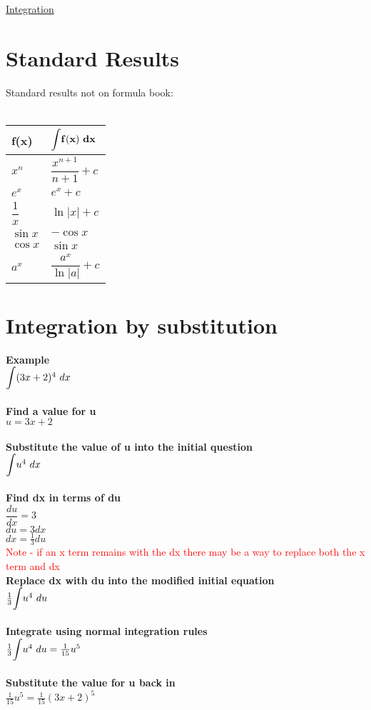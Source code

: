 \documentclass{article}[18pt]
\begin{document}
\begin{center}
\underline{\huge Integration}
\end{center}
\section{Standard Results}
Standard results not on formula book:\\
\\
{\renewcommand{\arraystretch}{2}
\begin{tabu} to \textwidth { | X[c] | X[c] | }
 \hline
 \textbf{f(x)} & $\mathbf{\mathlarger{\int} f(x)\ dx}$ \\
 \hline
 $x^n$  & $\dfrac{x^{n+1}}{n+1}+c$ \\
\hline
$e^x$&$e^x+c$\\
\hline
$\dfrac{1}{x}$&$\ln|x|+c$\\
\hline
$\sin x$&$-\cos x$\\
\hline
$\cos x$&$\sin x$\\
\hline
$a^x$&$\dfrac{a^x}{\ln|a|}+c$\\
\hline
\end{tabu}
}
\section{Integration by substitution}
\textbf{Example}\\
$\mathlarger{\int}(3x+2)^4 \ dx$\\
\\
\textbf{Find a value for u}\\
$u=3x+2$\\
\\
\textbf{Substitute the value of u into the initial question}\\
$\mathlarger{\int}u^4 \ dx$\\
\\
\textbf{Find dx in terms of du}\\
$\dfrac{du}{dx}=3$\\
$du=3dx$\\
$dx=\frac{1}{3}du$\\
\textcolor{red}{Note - if an x term remains with the dx there may be a way to replace both the x term and dx}
\\
\textbf{Replace dx with du into the modified initial equation}\\
$\frac{1}{3}\mathlarger{\int}u^4 \ du$\\
\\
\textbf{Integrate using normal integration rules}\\
$\frac{1}{3}\mathlarger{\int}u^4 \ du=\frac{1}{15}u^5$\\
\\
\textbf{Substitute the value for u back in}\\
$\frac{1}{15}u^5=\frac{1}{15}(3x+2)^5$\\
\newpage
\end{document}
